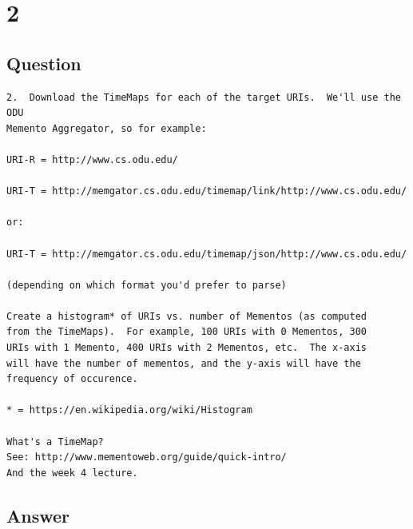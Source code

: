 \documentclass[letterpaper,11pt]{article}
\newcommand*{\srcPath}{../src}%
\begin{document}





\clearpage


\section*{2}

\subsection*{Question}

\begin{verbatim}
2.  Download the TimeMaps for each of the target URIs.  We'll use the ODU 
Memento Aggregator, so for example:

URI-R = http://www.cs.odu.edu/

URI-T = http://memgator.cs.odu.edu/timemap/link/http://www.cs.odu.edu/

or:

URI-T = http://memgator.cs.odu.edu/timemap/json/http://www.cs.odu.edu/

(depending on which format you'd prefer to parse)

Create a histogram* of URIs vs. number of Mementos (as computed
from the TimeMaps).  For example, 100 URIs with 0 Mementos, 300
URIs with 1 Memento, 400 URIs with 2 Mementos, etc.  The x-axis
will have the number of mementos, and the y-axis will have the
frequency of occurence.

* = https://en.wikipedia.org/wiki/Histogram

What's a TimeMap?  
See: http://www.mementoweb.org/guide/quick-intro/
And the week 4 lecture. 
\end{verbatim}

\clearpage

\subsection*{Answer}
\end{document}
